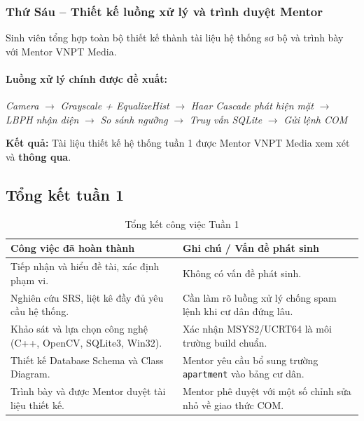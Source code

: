\documentclass[12pt,a4paper]{article}
\begin{document}
\subsubsection{Thứ Sáu -- Thiết kế luồng xử lý và trình duyệt Mentor}

Sinh viên tổng hợp toàn bộ thiết kế thành tài liệu hệ thống sơ bộ và trình bày với Mentor VNPT Media.

\paragraph{Luồng xử lý chính được đề xuất:}
\begin{center}
    \textit{Camera} $\rightarrow$ \textit{Grayscale + EqualizeHist} $\rightarrow$ \textit{Haar Cascade phát hiện mặt} $\rightarrow$ \textit{LBPH nhận diện} $\rightarrow$ \textit{So sánh ngưỡng} $\rightarrow$ \textit{Truy vấn SQLite} $\rightarrow$ \textit{Gửi lệnh COM}
\end{center}

\textbf{Kết quả:} Tài liệu thiết kế hệ thống tuần 1 được Mentor VNPT Media xem xét và \textbf{thông qua}.

\subsection{Tổng kết tuần 1}

\begin{table}[H]
    \centering
    \renewcommand{\arraystretch}{1.4}
    \begin{tabular}{|p{7cm}|p{7cm}|}
        \hline
        \rowcolor{lightblue}
        \textbf{Công việc đã hoàn thành} & \textbf{Ghi chú / Vấn đề phát sinh} \\
        \hline
        Tiếp nhận và hiểu đề tài, xác định phạm vi. & Không có vấn đề phát sinh. \\
        \hline
        Nghiên cứu SRS, liệt kê đầy đủ yêu cầu hệ thống. & Cần làm rõ luồng xử lý chống spam lệnh khi cư dân đứng lâu. \\
        \hline
        Khảo sát và lựa chọn công nghệ (C++, OpenCV, SQLite3, Win32). & Xác nhận MSYS2/UCRT64 là môi trường build chuẩn. \\
        \hline
        Thiết kế Database Schema và Class Diagram. & Mentor yêu cầu bổ sung trường \texttt{apartment} vào bảng cư dân. \\
        \hline
        Trình bày và được Mentor duyệt tài liệu thiết kế. & Mentor phê duyệt với một số chỉnh sửa nhỏ về giao thức COM. \\
        \hline
    \end{tabular}
    \caption{Tổng kết công việc Tuần 1}
\end{table}
\end{document}
